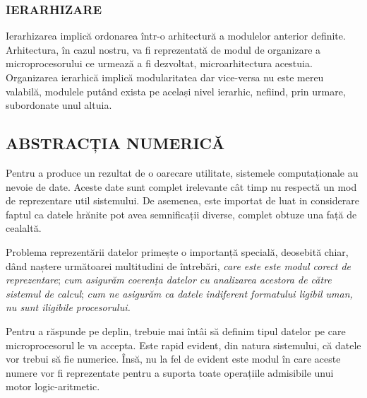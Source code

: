 \documentclass[12pt]{article}
\begin{document}
\subsubsection{IERARHIZARE}
Ierarhizarea implică ordonarea într-o arhitectură a modulelor anterior definite. Arhitectura, în cazul nostru, va fi reprezentată de modul de organizare a microprocesorului ce urmează a fi dezvoltat, microarhitectura acestuia. Organizarea ierarhică implică modularitatea dar vice-versa nu este mereu valabilă, modulele putând exista pe același nivel ierarhic, nefiind, prin urmare, subordonate unul altuia.

\subsection{ABSTRACȚIA NUMERICĂ}
Pentru a produce un rezultat de o oarecare utilitate, sistemele computaționale au nevoie de date. Aceste date sunt complet irelevante cât timp nu respectă un mod de reprezentare util sistemului. De asemenea, este importat de luat in considerare faptul ca datele hrănite pot avea semnificații diverse, complet obtuze una față de cealaltă.


Problema reprezentării datelor primește o importanță specială, deosebită chiar, dând naștere următoarei multitudini de întrebări, \textit{care este este modul corect de reprezentare}; \textit{cum asigurăm coerența datelor cu analizarea acestora de către sistemul de calcul}; \textit{cum ne asigurăm ca datele indiferent formatului ligibil uman, nu sunt iligibile procesorului.}


Pentru a răspunde pe deplin, trebuie mai întâi să definim tipul datelor pe care microprocesorul le va accepta. Este rapid evident, din natura sistemului, că datele vor trebui să fie numerice. Însă, nu la fel de evident este modul în care aceste numere vor fi reprezentate pentru a suporta toate operațiile admisibile unui motor logic-aritmetic.
\bigbreak
\end{document}
